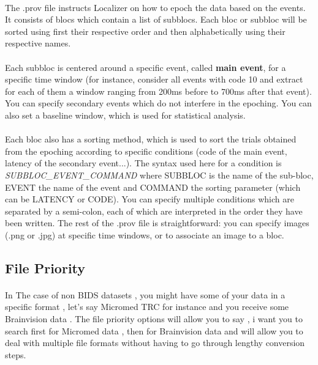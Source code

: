 \documentclass[a4paper]{article}
\begin{document}
\paragraph{} The .prov file instructs Localizer on how to epoch the data based on the events. It consists of blocs which contain a list of subblocs. Each bloc or subbloc will be sorted using first their respective order and then alphabetically using their respective names.
\paragraph{} Each subbloc is centered around a specific event, called \textbf{main event}, for a specific time window (for instance, consider all events with code 10 and extract for each of them a window ranging from 200ms before to 700ms after that event). You can specify secondary events which do not interfere in the epoching. You can also set a baseline window, which is used for statistical analysis.
\paragraph{} Each bloc also has a sorting method, which is used to sort the trials obtained from the epoching according to specific conditions (code of the main event, latency of the secondary event...). The syntax used here for a condition is \textit{SUBBLOC{\_}EVENT{\_}COMMAND} where SUBBLOC is the name of the sub-bloc, EVENT the name of the event and COMMAND the sorting parameter (which can be LATENCY or CODE). You can specify multiple conditions which are separated by a semi-colon, each of which are interpreted in the order they have been written. The rest of the .prov file is straightforward: you can specify images (.png or .jpg) at specific time windows, or to associate an image to a bloc. 
\subsection{File Priority}
\paragraph{} In The case of non BIDS datasets , you might have some of your data in a specific format , let's say Micromed TRC for instance and you receive some Brainvision data . The file priority options will allow you to say , i want you to search first for Micromed data , then for Brainvision data and will allow you to deal with multiple file formats without having to go through lengthy conversion steps.
\end{document}
